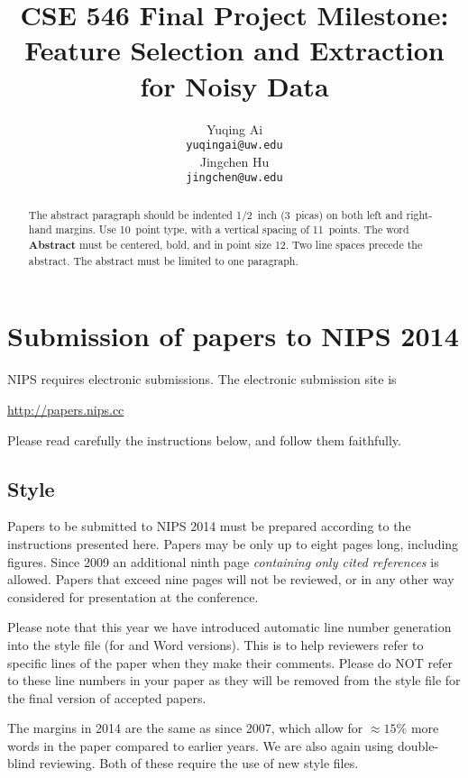 \documentclass{article} %
\title{CSE 546 Final Project Milestone:\\
	Feature Selection and Extraction for Noisy Data}
\author{
	Yuqing Ai \\
	\texttt{yuqingai@uw.edu} \\
	\And
	Jingchen Hu \\
	\texttt{jingchen@uw.edu} \\
}
\begin{document}
	
	
	\maketitle
	
	\begin{abstract}
		The abstract paragraph should be indented 1/2~inch (3~picas) on both left and
		right-hand margins. Use 10~point type, with a vertical spacing of 11~points.
		The word \textbf{Abstract} must be centered, bold, and in point size 12. Two
		line spaces precede the abstract. The abstract must be limited to one
		paragraph.
	\end{abstract}
	
	\section{Submission of papers to NIPS 2014}
	
	NIPS requires electronic submissions.  The electronic submission site is  
	\begin{center}
		\url{http://papers.nips.cc}
	\end{center}
	
	Please read carefully the
	instructions below, and follow them faithfully.
	\subsection{Style}
	
	Papers to be submitted to NIPS 2014 must be prepared according to the
	instructions presented here. Papers may be only up to eight pages long,
	including figures. Since 2009 an additional ninth page \textit{containing only
		cited references} is allowed. Papers that exceed nine pages will not be
	reviewed, or in any other way considered for presentation at the conference.
	
	Please note that this year we have introduced automatic line number generation
	into the style file (for \LaTeXe and Word versions). This is to help reviewers
	refer to specific lines of the paper when they make their comments. Please do
	NOT refer to these line numbers in your paper as they will be removed from the
	style file for the final version of accepted papers.
	
	The margins in 2014 are the same as since 2007, which allow for $\approx 15\%$
	more words in the paper compared to earlier years. We are also again using 
	double-blind reviewing. Both of these require the use of new style files.
	
\end{document}
